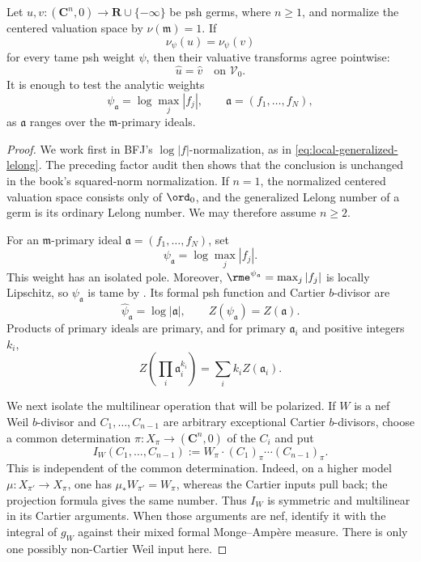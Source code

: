 \begin{theorem}\label{thm:local-generalized-lelong-separation}
Let \(u,v:(\mathbf C^n,0)\to\mathbf R\cup\{-\infty\}\) be psh germs,
where \(n\geq1\), and normalize the centered valuation space by
\(\nu(\mathfrak m)=1\).  If
\[
                         \nu_\psi(u)=\nu_\psi(v)
\]
for every tame psh weight \(\psi\), then their valuative transforms agree
pointwise:
\[
                         \widehat u=\widehat v
                  \quad\text{on }\mathcal V_0.
\]
It is enough to test the analytic weights
\[
 \psi_{\mathfrak a}=\log\max_j|f_j|,
 \qquad \mathfrak a=(f_1,\ldots,f_N),
\]
as \(\mathfrak a\) ranges over the \(\mathfrak m\)-primary ideals.
\end{theorem}

\begin{proof}
We work first in BFJ's \(\log|f|\)-normalization, as in
\eqref{eq:local-generalized-lelong}.  The preceding factor audit then shows
that the conclusion is unchanged in the book's squared-norm normalization.
If \(n=1\), the normalized centered valuation space consists only of
\(\ord_0\), and the generalized Lelong number of a germ is its ordinary
Lelong number.  We may therefore assume \(n\geq2\).

For an \(\mathfrak m\)-primary ideal
\(\mathfrak a=(f_1,\ldots,f_N)\), set
\[
                         \psi_{\mathfrak a}=\log\max_j|f_j|.
\]
This weight has an isolated pole.  Moreover,
\(\rme^{\psi_{\mathfrak a}}=\max_j|f_j|\) is locally Lipschitz, so
\(\psi_{\mathfrak a}\) is tame by
\cite[Lemma~5.10]{BFJ08}.  Its formal psh function and Cartier
\(b\)-divisor are
\[
 \widehat\psi_{\mathfrak a}=\log|\mathfrak a|,
 \qquad Z(\psi_{\mathfrak a})=Z(\mathfrak a).
\]
Products of primary ideals are primary, and for primary
\(\mathfrak a_i\) and positive integers \(k_i\),
\[
 Z\!\left(\prod_i\mathfrak a_i^{k_i}\right)
                       =\sum_i k_i Z(\mathfrak a_i).
\]

We next isolate the multilinear operation that will be polarized.  If
\(W\) is a nef Weil \(b\)-divisor and
\(C_1,\ldots,C_{n-1}\) are arbitrary exceptional Cartier
\(b\)-divisors, choose a common determination
\(\pi:X_\pi\to(\mathbf C^n,0)\) of the \(C_i\) and put
\[
 I_W(C_1,\ldots,C_{n-1})
 :=W_\pi\cdot(C_1)_\pi\cdots(C_{n-1})_\pi.
\]
This is independent of the common determination.  Indeed, on a higher model
\(\mu:X_{\pi'}\to X_\pi\), one has
\(\mu_*W_{\pi'}=W_\pi\), whereas the Cartier inputs pull back; the
projection formula gives the same number.  Thus \(I_W\) is symmetric and
multilinear in its Cartier arguments.  When those arguments are nef,
\cite[Propositions~4.6 and~4.9]{BFJ08} identify it with the integral of
\(g_W\) against their mixed formal Monge--Amp\`ere measure.  There is only
one possibly non-Cartier Weil input here.


\end{proof}
